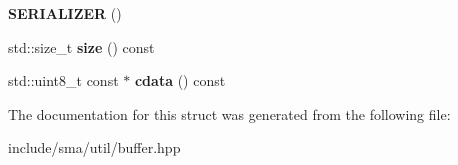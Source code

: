 \begin{DoxyCompactItemize}
\item 
\hypertarget{structsma_1_1Buffer_a884bdc40749615b1e4e12a1dfd1d0139}{{\bfseries S\-E\-R\-I\-A\-L\-I\-Z\-E\-R} ()}\label{structsma_1_1Buffer_a884bdc40749615b1e4e12a1dfd1d0139}

\item 
\hypertarget{structsma_1_1Buffer_acbbcb6b9e4edcca7d73f9faad16be4f4}{std\-::size\-\_\-t {\bfseries size} () const }\label{structsma_1_1Buffer_acbbcb6b9e4edcca7d73f9faad16be4f4}

\item 
\hypertarget{structsma_1_1Buffer_a05863812cbf141b22709ef2f39e30e40}{std\-::uint8\-\_\-t const $\ast$ {\bfseries cdata} () const }\label{structsma_1_1Buffer_a05863812cbf141b22709ef2f39e30e40}

\end{DoxyCompactItemize}


The documentation for this struct was generated from the following file\-:\begin{DoxyCompactItemize}
\item 
include/sma/util/buffer.\-hpp\end{DoxyCompactItemize}
